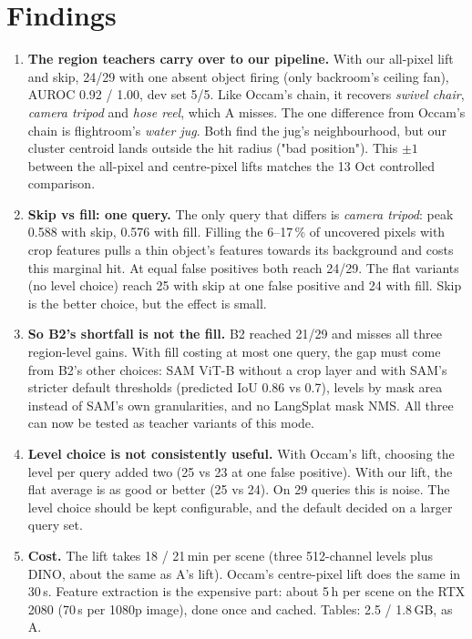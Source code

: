 \documentclass[11pt,a4paper]{article}
\begin{document}
\section{Findings}
\begin{enumerate}[leftmargin=*,itemsep=3pt]
  \item \textbf{The region teachers carry over to our pipeline.} With our all-pixel lift and skip, 24/29 with one absent
        object firing (only backroom's ceiling fan), AUROC 0.92 / 1.00, dev set 5/5. Like Occam's chain, it recovers
        \emph{swivel chair}, \emph{camera tripod} and \emph{hose reel}, which A misses. The one difference from Occam's
        chain is flightroom's \emph{water jug}. Both find the jug's neighbourhood, but our cluster centroid lands outside
        the hit radius ("bad position"). This $\pm1$ between the all-pixel and centre-pixel lifts matches the 13 Oct
        controlled comparison.
  \item \textbf{Skip vs fill: one query.} The only query that differs is \emph{camera tripod}: peak 0.588 with skip,
        0.576 with fill. Filling the 6--17\,\% of uncovered pixels with crop features pulls a thin object's features
        towards its background and costs this marginal hit. At equal false positives both reach 24/29. The flat
        variants (no level choice) reach 25 with skip at one false positive and 24 with fill. Skip is the better choice,
        but the effect is small.
  \item \textbf{So B2's shortfall is not the fill.} B2 reached 21/29 and misses all three region-level gains. With fill
        costing at most one query, the gap must come from B2's other choices: SAM ViT-B without a crop layer and with SAM's stricter
        default thresholds (predicted IoU 0.86 vs 0.7), levels by mask area instead of SAM's own granularities, and
        no LangSplat mask NMS. All three can now be tested as teacher variants
        of this mode.
  \item \textbf{Level choice is not consistently useful.} With Occam's lift, choosing the level per query added two
        (25 vs 23 at one false positive). With our lift, the flat average is as good or better (25 vs 24). On 29 queries
        this is noise. The level choice should be kept configurable, and the default decided on a larger query set.
  \item \textbf{Cost.} The lift takes 18 / 21\,min per scene (three 512-channel levels plus DINO, about the same as A's
        lift). Occam's centre-pixel lift does the same in 30\,s. Feature extraction is the expensive part: about 5\,h per
        scene on the RTX 2080 (70\,s per 1080p image), done once and cached. Tables: 2.5 / 1.8\,GB, as A.
\end{enumerate}
\end{document}
